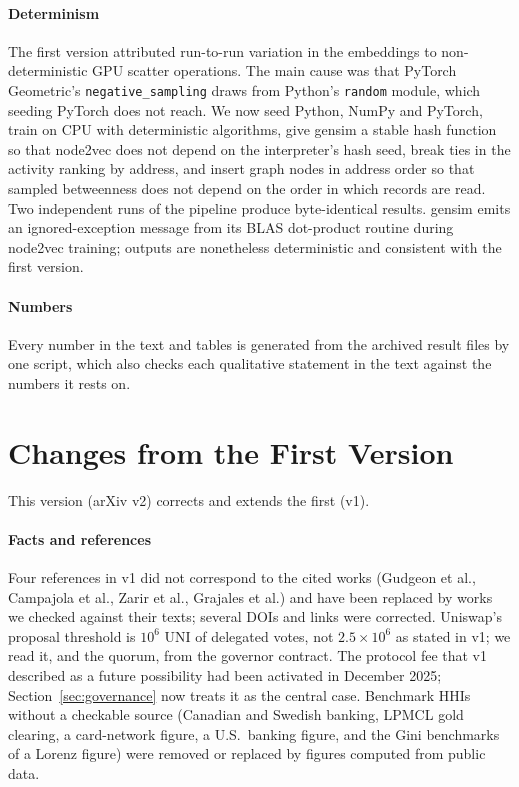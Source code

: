 \paragraph{Determinism} The first version attributed run-to-run variation in
the embeddings to non-deterministic GPU scatter operations. The main cause
was that PyTorch Geometric's \texttt{negative\_sampling} draws from Python's
\texttt{random} module, which seeding PyTorch does not reach. We now seed
Python, NumPy and PyTorch, train on CPU with deterministic algorithms, give
gensim a stable hash function so that node2vec does not depend on the
interpreter's hash seed, break ties in the activity ranking by address, and
insert graph nodes in address order so that sampled betweenness does not
depend on the order in which records are read. Two independent runs of the
pipeline produce byte-identical results. gensim emits an ignored-exception
message from its BLAS dot-product routine during node2vec training; outputs
are nonetheless deterministic and consistent with the first version.

\paragraph{Numbers} Every number in the text and tables is generated from the
archived result files by one script, which also checks each qualitative
statement in the text against the numbers it rests on.

\section{Changes from the First Version}
\label{app:changes}
This version (arXiv v2) corrects and extends the first (v1).

\paragraph{Facts and references}
Four references in v1 did not correspond to the cited works (Gudgeon et al.,
Campajola et al., Zarir et al., Grajales et al.) and have been replaced by
works we checked against their texts; several DOIs and links were corrected.
Uniswap's proposal threshold is $10^{6}$ UNI of delegated votes, not
$2.5\times10^{6}$ as stated in v1; we read it, and the quorum, from the
governor contract. The protocol fee that v1 described as a future possibility
had been activated in December 2025; Section~\ref{sec:governance} now treats
it as the central case. Benchmark HHIs without a checkable source (Canadian
and Swedish banking, LPMCL gold clearing, a card-network figure, a U.S.\
banking figure, and the Gini benchmarks of a Lorenz figure) were removed or
replaced by figures computed from public data.


